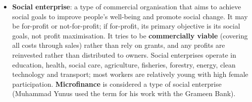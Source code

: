 \documentclass[a4paper,12pt]{article}
\newcommand{\needbold}[1]{\textcolor{red!70!black}{\textbf{#1}}}
\begin{document}
\begin{itemize}
\begin{itemize}
    \item \textbf{Reduced vulnerability} to fluctuating export prices.
    \item \textbf{Use of domestic raw materials} as the base for manufacturing (successful examples: Malaysia, Thailand, Indonesia, China, Chile, Mauritius).
  \end{itemize}
  \item \needbold{Social enterprise}: a type of commercial organisation that aims to achieve social goals to improve people's well-being and promote social change. It may be for-profit or not-for-profit; if for-profit, its primary objective is its social goals, not profit maximisation. It tries to be \textbf{commercially viable} (covering all costs through sales) rather than rely on grants, and any profits are reinvested rather than distributed to owners. Social enterprises operate in education, health, social care, agriculture, fisheries, forestry, energy, clean technology and transport; most workers are relatively young with high female participation. \textbf{Microfinance} is considered a type of social enterprise (Muhammad Yunus used the term for his work with the Grameen Bank).
\end{itemize}
\end{document}
